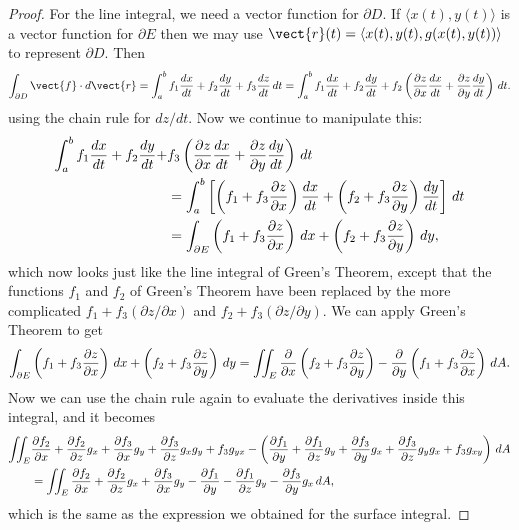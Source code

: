 \begin{proof}
For the line integral, we need a vector function for $\partial D$. If 
$\langle x(t),y(t)\rangle$ is a vector function for 
$\partial E$ then we may use $\vect{r}(t)=\langle x(t),y(t),g(x(t),y(t))\rangle$
to represent $\partial D$. Then
$$\int_{\partial D}\vect{f}\cdot d\vect{r}
=\int_a^b f_1{dx\over dt}+f_2{dy\over dt}+f_3{dz\over dt}\,dt
=\int_a^b f_1{dx\over dt}+f_2{dy\over dt}+f_2\left({\partial z\over\partial
    x}{dx\over dt}+{\partial z\over\partial y}{dy\over dt}\right)\,dt.$$
using the chain rule for $dz/dt$. Now we continue to manipulate this:
\begin{align*}
\int_a^b f_1{dx\over dt}+f_2{dy\over dt}+&f_3\left({\partial z\over\partial
    x}{dx\over dt}+{\partial z\over\partial y}{dy\over dt}\right)\,dt	\\
&=\int_a^b \left[\left(f_1+f_3{\partial z\over\partial x}\right){dx\over dt}+
\left(f_2+f_3{\partial z\over\partial y}\right){dy\over dt}\right]\,dt	\\
&=\int_{\partial E} \left(f_1+f_3{\partial z\over\partial x}\right)\,dx+
\left(f_2+f_3{\partial z\over\partial y}\right)\,dy,
\end{align*}
which now looks just like the line integral of Green's Theorem, except
that the functions $f_1$ and $f_2$ of Green's Theorem have been replaced
by the more complicated $f_1+f_3(\partial z/\partial x)$
and $f_2+f_3(\partial z/\partial y)$. We can apply Green's Theorem to get
$$\int_{\partial E} \left(f_1+f_3{\partial z\over\partial x}\right)\,dx+
\left(f_2+f_3{\partial z\over\partial y}\right)\,dy=
\iint_{E} {\partial\over \partial x}\left(f_2+f_3{\partial z\over\partial y}\right)
-{\partial\over \partial y}\left(f_1+f_3{\partial z\over\partial x}\right)\,dA.$$
Now we can use the chain rule again to evaluate the derivatives
inside this integral, and it becomes
\begin{align*}
\iint_{E} &{\partial f_2 \over \partial x}+{\partial f_2 \over \partial z}g_x+{\partial f_3 \over \partial x}g_y+{\partial f_3 \over \partial z}g_xg_y+f_3g_{yx}-
\left({\partial f_1 \over \partial y}+{\partial f_1 \over \partial z}g_y+{\partial f_3 \over \partial y}g_x+{\partial f_3 \over \partial z}g_yg_x+f_3g_{xy}\right)\,dA	\\
&=\iint_{E} {\partial f_2 \over \partial x}+{\partial f_2 \over \partial z}g_x+{\partial f_3 \over \partial x}g_y-{\partial f_1 \over \partial y}-{\partial f_1 \over \partial z}g_y-{\partial f_3 \over \partial y}g_x\,dA,
\end{align*}
which is the same as the expression we obtained for the surface
integral.
\end{proof}


